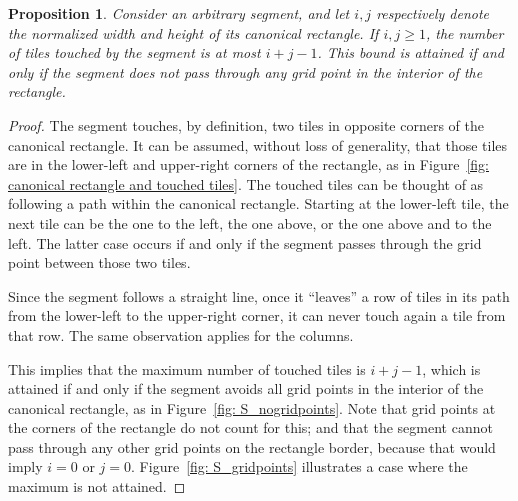 \documentclass[12pt, a4paper]{article}
\newtheorem{proposition}{Proposition}%
\begin{document}
\begin{proposition}
\label{prop: i+j-1}
Consider an arbitrary segment, and let $i, j$ respectively denote the normalized width and height of its canonical rectangle. If $i, j \geq 1$, the number of tiles touched by the segment is at most $i+j-1$. This bound is attained if and only if the segment does not pass through any grid point in the interior of the rectangle.
\end{proposition}

\begin{proof}
The segment touches, by definition, two tiles in opposite corners of the canonical rectangle. It can be assumed, without loss of generality, that those tiles are in the lower-left and upper-right corners of the rectangle, as in Figure~\ref{fig: canonical rectangle and touched tiles}. The touched tiles can be thought of as following a path within the canonical rectangle. Starting at the lower-left tile, the next tile can be the one to the left, the one above, or the one above and to the left. The latter case occurs if and only if the segment passes through the grid point between those two tiles.

Since the segment follows a straight line, once it ``leaves'' a row of tiles in its path from the lower-left to the upper-right corner, it can never touch again a tile from that row. The same observation applies for the columns.

This implies that the maximum number of touched tiles is $i+j-1$, which is attained if and only if the segment avoids all grid points in the interior of the canonical rectangle, as in Figure~\ref{fig: S_nogridpoints}. Note that grid points at the corners of the rectangle do not count for this; and that the segment cannot pass through any other grid points on the rectangle border, because that would imply $i=0$ or $j=0$. Figure~\ref{fig: S_gridpoints} illustrates a case where the maximum is not attained.
\end{proof}
\end{document}
